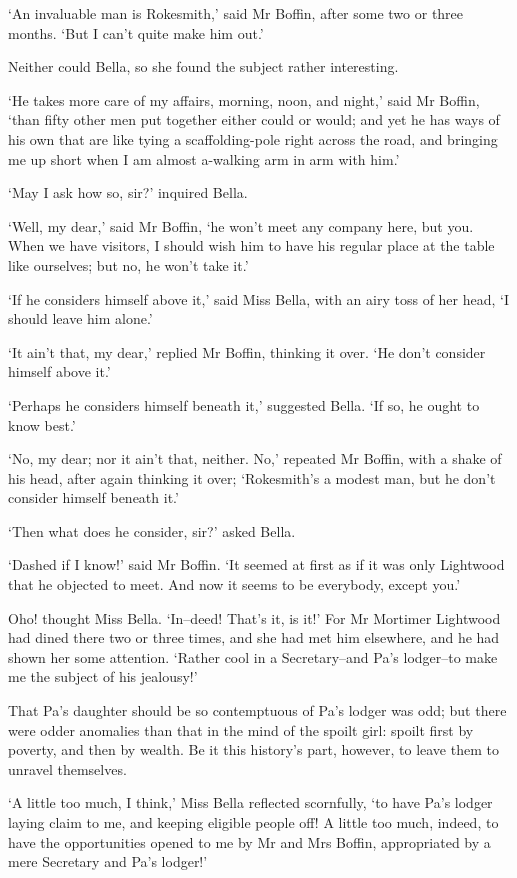 ‘An invaluable man is Rokesmith,’ said Mr Boffin, after some two or
three months. ‘But I can’t quite make him out.’

Neither could Bella, so she found the subject rather interesting.

‘He takes more care of my affairs, morning, noon, and night,’ said Mr
Boffin, ‘than fifty other men put together either could or would; and
yet he has ways of his own that are like tying a scaffolding-pole right
across the road, and bringing me up short when I am almost a-walking arm
in arm with him.’

‘May I ask how so, sir?’ inquired Bella.

‘Well, my dear,’ said Mr Boffin, ‘he won’t meet any company here, but
you. When we have visitors, I should wish him to have his regular place
at the table like ourselves; but no, he won’t take it.’

‘If he considers himself above it,’ said Miss Bella, with an airy toss
of her head, ‘I should leave him alone.’

‘It ain’t that, my dear,’ replied Mr Boffin, thinking it over. ‘He don’t
consider himself above it.’

‘Perhaps he considers himself beneath it,’ suggested Bella. ‘If so, he
ought to know best.’

‘No, my dear; nor it ain’t that, neither. No,’ repeated Mr Boffin, with
a shake of his head, after again thinking it over; ‘Rokesmith’s a modest
man, but he don’t consider himself beneath it.’

‘Then what does he consider, sir?’ asked Bella.

‘Dashed if I know!’ said Mr Boffin. ‘It seemed at first as if it
was only Lightwood that he objected to meet. And now it seems to be
everybody, except you.’

Oho! thought Miss Bella. ‘In--deed! That’s it, is it!’ For Mr Mortimer
Lightwood had dined there two or three times, and she had met him
elsewhere, and he had shown her some attention. ‘Rather cool in a
Secretary--and Pa’s lodger--to make me the subject of his jealousy!’

That Pa’s daughter should be so contemptuous of Pa’s lodger was odd;
but there were odder anomalies than that in the mind of the spoilt girl:
spoilt first by poverty, and then by wealth. Be it this history’s part,
however, to leave them to unravel themselves.

‘A little too much, I think,’ Miss Bella reflected scornfully, ‘to
have Pa’s lodger laying claim to me, and keeping eligible people off!
A little too much, indeed, to have the opportunities opened to me by Mr
and Mrs Boffin, appropriated by a mere Secretary and Pa’s lodger!’

